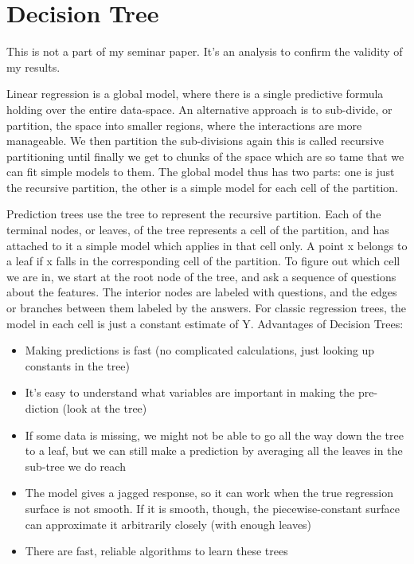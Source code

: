 \documentclass[a4paper,11pt,english]{sphinxmanual}
\begin{document}
\section{Decision Tree}
\label{\detokenize{analysis:decision-tree}}
This is not a part of my seminar paper. It’s an analysis to confirm the validity of my results.

Linear regression is a global model, where there is a single predictive formula holding over the entire data-space.
An alternative approach is to sub-divide, or partition, the space into smaller regions, where the interactions are more manageable. We then partition the sub-divisions again this is called recursive partitioning  until finally we get to chunks of the space which are so tame that we can fit simple models to them. The global model thus has two parts: one is just the recursive partition, the other is a simple model for each cell of the partition.

Prediction trees use the tree to represent the recursive partition. Each of the terminal nodes, or leaves, of the tree represents a cell of the partition, and has attached to it a simple model which applies in that cell only. A point x belongs to a leaf if x falls in the corresponding cell of the partition. To figure out which cell we are in, we start at the root node of the tree, and ask a sequence of questions about the features. The interior nodes are labeled with questions, and the edges or branches between them labeled by the answers.
For classic regression trees, the model in each cell is just a constant estimate of
Y.
Advantages of Decision Trees:
\begin{itemize}
\item {} 
Making predictions is fast (no complicated calculations, just looking up constants in the tree)

\item {} 
It’s easy to understand what variables are important in making the pre- diction (look at the tree)

\item {} 
If some data is missing, we might not be able to go all the way down the tree to a leaf, but we can still make a prediction by averaging all the leaves in the sub-tree we do reach

\item {} 
The model gives a jagged response, so it can work when the true regression surface is not smooth. If it is smooth, though, the piecewise-constant surface can approximate it arbitrarily closely (with enough leaves)

\item {} 
There are fast, reliable algorithms to learn these trees

\end{itemize}
\end{document}
